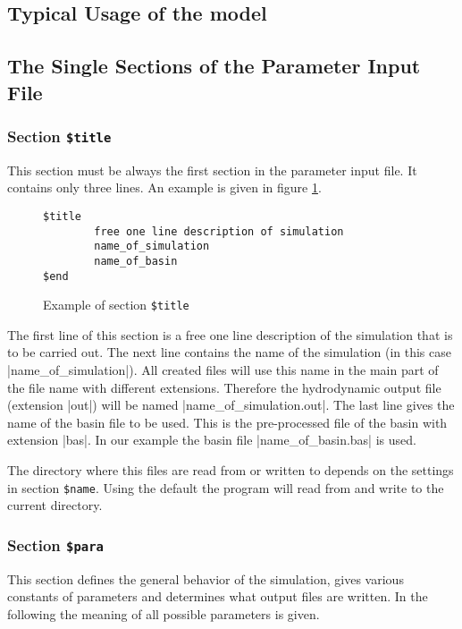 \documentclass{report}
\begin{document}
\subsection{Typical Usage of the model}



\subsection{The Single Sections of the Parameter Input File}

\subsubsection{Section {\tt \$title}}

This section must be always the first section in the parameter input file.
It contains only three lines. An example is given in 
figure \ref{fig:titleexample}.

\begin{figure}[ht]
\begin{verbatim}
$title
        free one line description of simulation
        name_of_simulation
        name_of_basin
$end
\end{verbatim}
\caption{Example of section {\tt \$title}}
\label{fig:titleexample}
\end{figure}

The first line of this section is a free one line description of
the simulation that is to be carried out. The next line contains
the name of the simulation (in this case |name_of_simulation|).
All created files will use this name in the main part of the file name
with different extensions. Therefore the hydrodynamic output file
(extension |out|) will be named |name_of_simulation.out|.
The last line gives the name of the basin file to be used. This
is the pre-processed file of the basin with extension |bas|.
In our example the basin file |name_of_basin.bas| is used.

The directory where this files are read from or written to depends
on the settings in section {\tt \$name}. Using the default
the program will read from and write to the current directory.

\subsubsection{Section {\tt \$para}}

This section defines the general behavior of the simulation,
gives various constants of parameters and determines what
output files are written. In the following the meaning of
all possible parameters is given.
\end{document}
